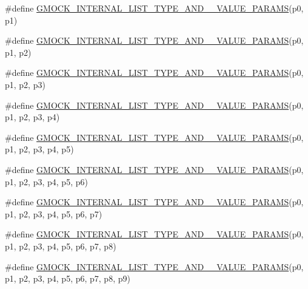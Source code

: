 \begin{DoxyCompactItemize}
\item 
\#define \hyperlink{gmock-generated-actions_8h_a0cc50d9b0c031e712a38a3266b03af48}{G\+M\+O\+C\+K\+\_\+\+I\+N\+T\+E\+R\+N\+A\+L\+\_\+\+L\+I\+S\+T\+\_\+\+T\+Y\+P\+E\+\_\+\+A\+N\+D\+\_\+\_\+\+V\+A\+L\+U\+E\+\_\+\+P\+A\+R\+A\+MS}(p0,  p1)
\item 
\#define \hyperlink{gmock-generated-actions_8h_a5654c0d7f59fc85880c24738b6cb5976}{G\+M\+O\+C\+K\+\_\+\+I\+N\+T\+E\+R\+N\+A\+L\+\_\+\+L\+I\+S\+T\+\_\+\+T\+Y\+P\+E\+\_\+\+A\+N\+D\+\_\+\_\+\+V\+A\+L\+U\+E\+\_\+\+P\+A\+R\+A\+MS}(p0,  p1,  p2)
\item 
\#define \hyperlink{gmock-generated-actions_8h_ad00ece06c41ce47e499fef47d0ee9459}{G\+M\+O\+C\+K\+\_\+\+I\+N\+T\+E\+R\+N\+A\+L\+\_\+\+L\+I\+S\+T\+\_\+\+T\+Y\+P\+E\+\_\+\+A\+N\+D\+\_\+\_\+\+V\+A\+L\+U\+E\+\_\+\+P\+A\+R\+A\+MS}(p0,  p1,  p2,  p3)
\item 
\#define \hyperlink{gmock-generated-actions_8h_a48e2764f7132a1840c2a4afe8d43556b}{G\+M\+O\+C\+K\+\_\+\+I\+N\+T\+E\+R\+N\+A\+L\+\_\+\+L\+I\+S\+T\+\_\+\+T\+Y\+P\+E\+\_\+\+A\+N\+D\+\_\+\_\+\+V\+A\+L\+U\+E\+\_\+\+P\+A\+R\+A\+MS}(p0,  p1,  p2,  p3,  p4)
\item 
\#define \hyperlink{gmock-generated-actions_8h_ab2f48b9bf3f455e081eac982aee31740}{G\+M\+O\+C\+K\+\_\+\+I\+N\+T\+E\+R\+N\+A\+L\+\_\+\+L\+I\+S\+T\+\_\+\+T\+Y\+P\+E\+\_\+\+A\+N\+D\+\_\+\_\+\+V\+A\+L\+U\+E\+\_\+\+P\+A\+R\+A\+MS}(p0,  p1,  p2,  p3,  p4,  p5)
\item 
\#define \hyperlink{gmock-generated-actions_8h_aa090e804a45b4373d38e6a0aa35e5997}{G\+M\+O\+C\+K\+\_\+\+I\+N\+T\+E\+R\+N\+A\+L\+\_\+\+L\+I\+S\+T\+\_\+\+T\+Y\+P\+E\+\_\+\+A\+N\+D\+\_\+\_\+\+V\+A\+L\+U\+E\+\_\+\+P\+A\+R\+A\+MS}(p0,  p1,  p2,  p3,  p4,  p5,  p6)
\item 
\#define \hyperlink{gmock-generated-actions_8h_ac46093455522025b3461ed0dfd326836}{G\+M\+O\+C\+K\+\_\+\+I\+N\+T\+E\+R\+N\+A\+L\+\_\+\+L\+I\+S\+T\+\_\+\+T\+Y\+P\+E\+\_\+\+A\+N\+D\+\_\+\_\+\+V\+A\+L\+U\+E\+\_\+\+P\+A\+R\+A\+MS}(p0,  p1,  p2,  p3,  p4,  p5,  p6,  p7)
\item 
\#define \hyperlink{gmock-generated-actions_8h_a3f7dd2bdf5feb78d9cd6a538366fed46}{G\+M\+O\+C\+K\+\_\+\+I\+N\+T\+E\+R\+N\+A\+L\+\_\+\+L\+I\+S\+T\+\_\+\+T\+Y\+P\+E\+\_\+\+A\+N\+D\+\_\+\_\+\+V\+A\+L\+U\+E\+\_\+\+P\+A\+R\+A\+MS}(p0,  p1,  p2,  p3,  p4,  p5,  p6,  p7,  p8)
\item 
\#define \hyperlink{gmock-generated-actions_8h_a646b96a3f316fa629cf7faaf509de76e}{G\+M\+O\+C\+K\+\_\+\+I\+N\+T\+E\+R\+N\+A\+L\+\_\+\+L\+I\+S\+T\+\_\+\+T\+Y\+P\+E\+\_\+\+A\+N\+D\+\_\+\_\+\+V\+A\+L\+U\+E\+\_\+\+P\+A\+R\+A\+MS}(p0,  p1,  p2,  p3,  p4,  p5,  p6,  p7,  p8,  p9)

\end{DoxyCompactItemize}

